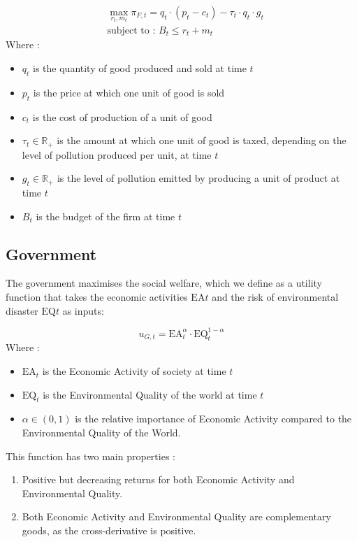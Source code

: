\documentclass{article}
\begin{document}
\begin{equation}
    \begin{split}
        &\max_{r_{t},m_{t}}{\pi_{F,t}=q_{t}\cdot\left(p_{t}-c_{t}\right)-\tau_{t}\cdot q_{t}\cdot g_{t}} \\
        &\text{subject to : } B_{t} \leq r_{t} + m_{t}
    \end{split}
\end{equation}
Where : 
\begin{itemize}
    \item $q_{t}$ is the quantity of good produced and sold at time $t$
    \item $p_{t}$ is the price at which one unit of good is sold
    \item $c_{t}$ is the cost of production of a unit of good
    \item $\tau_{t}\in\mathbb{R}_{+}$ is the amount at which one unit of good is taxed, depending on the level of pollution produced per unit, at time $t$
    \item $g_{t}\in\mathbb{R}_{+}$ is the level of pollution emitted by producing a unit of product at time $t$
    \item $B_{t}$ is the budget of the firm at time $t$
\end{itemize}

\subsection{Government}
The government maximises the social welfare, which we define as a utility function that takes the  economic activities $\text{EA}{t}$ and the risk of environmental disaster $\text{EQ}{t}$ as inputs: 

\begin{equation}
    u_{G,t}=\text{EA}_{t}^{\alpha}\cdot\text{EQ}_{t}^{1-\alpha}
\end{equation}
Where : 
\begin{itemize}
    \item $\text{EA}_{t}$ is the Economic Activity of society at time $t$
    \item $\text{EQ}_{t}$ is the Environmental Quality of the world at time $t$
    \item $\alpha \in \left(0,1\right)$ is the relative importance of Economic Activity compared to the Environmental Quality of the World.
\end{itemize}
This function has two main properties : 

\begin{enumerate}
    \item Positive but decreasing returns for both Economic Activity and Environmental Quality\footnotemark[1].
    \item Both Economic Activity and Environmental Quality are complementary goods, as the cross-derivative is positive\footnotemark[2].
\end{enumerate}
\end{document}
